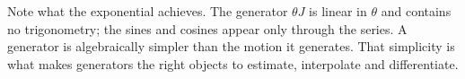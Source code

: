 Note what the exponential achieves. The generator $\theta J$ is linear in $\theta$ and contains no trigonometry; the sines and cosines appear only through the series. A generator is algebraically simpler than the motion it generates. That simplicity is what makes generators the right objects to estimate, interpolate and differentiate.
